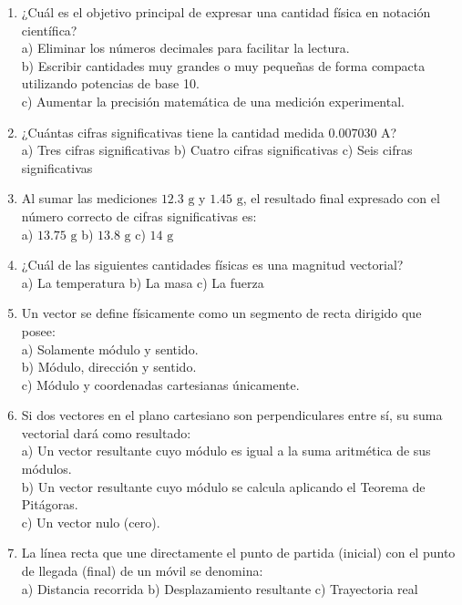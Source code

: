 \documentclass[10pt]{article}
\begin{document}
\begin{enumerate}[leftmargin=*]
    \item ¿Cuál es el objetivo principal de expresar una cantidad física en notación científica? \\
    a) Eliminar los números decimales para facilitar la lectura. \\
    b) Escribir cantidades muy grandes o muy pequeñas de forma compacta utilizando potencias de base 10. \\
    c) Aumentar la precisión matemática de una medición experimental.

    \item ¿Cuántas cifras significativas tiene la cantidad medida $0.007030\text{ A}$? \\
    a) Tres cifras significativas \hfill b) Cuatro cifras significativas \hfill c) Seis cifras significativas \hfill \mbox{}

    \item Al sumar las mediciones $12.3\text{ g}$ y $1.45\text{ g}$, el resultado final expresado con el número correcto de cifras significativas es: \\
    a) $13.75\text{ g}$ \hfill b) $13.8\text{ g}$ \hfill c) $14\text{ g}$ \hfill \mbox{}

    \item ¿Cuál de las siguientes cantidades físicas es una magnitud vectorial? \\
    a) La temperatura \hfill b) La masa \hfill c) La fuerza \hfill \mbox{}

    \item Un vector se define físicamente como un segmento de recta dirigido que posee: \\
    a) Solamente módulo y sentido. \\
    b) Módulo, dirección y sentido. \\
    c) Módulo y coordenadas cartesianas únicamente.

    \item Si dos vectores en el plano cartesiano son perpendiculares entre sí, su suma vectorial dará como resultado: \\
    a) Un vector resultante cuyo módulo es igual a la suma aritmética de sus módulos. \\
    b) Un vector resultante cuyo módulo se calcula aplicando el Teorema de Pitágoras. \\
    c) Un vector nulo (cero).

    \item La línea recta que une directamente el punto de partida (inicial) con el punto de llegada (final) de un móvil se denomina: \\
    a) Distancia recorrida \hfill b) Desplazamiento resultante \hfill c) Trayectoria real \hfill \mbox{}


\end{enumerate}
\end{document}
